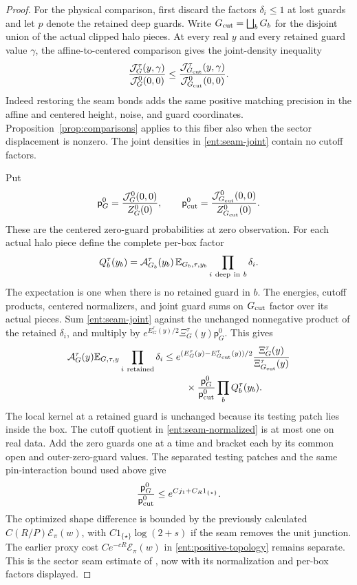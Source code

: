 \begin{proof}
For the physical comparison, first discard the factors
\(\delta_i\le1\) at lost guards and let \(p\) denote the retained
deep guards.  Write \(G_{\rm cut}=\bigsqcup_bG_b\) for the disjoint
union of the actual clipped halo pieces.  At every real \(y\) and
every retained guard value \(\gamma\), the affine-to-centered
comparison gives the joint-density inequality
\begin{equation}\label{ent:seam-joint}
 \frac{\mathcal J_G^\tau(y,\gamma)}{\mathcal J_G^0(0,0)}
 \le
 \frac{\mathcal J_{G_{\rm cut}}^\tau(y,\gamma)}
      {\mathcal J_{G_{\rm cut}}^0(0,0)}.
\end{equation}
Indeed restoring the seam bonds adds the same positive matching
precision in the affine and centered height, noise, and guard
coordinates.  Proposition~\ref{prop:comparisons} applies to this
fiber also when the sector displacement is nonzero.  The joint
densities in \eqref{ent:seam-joint} contain no cutoff factors.

Put
\[
 \mathsf p_G^0=\frac{\mathcal J_G^0(0,0)}{Z_G^0(0)},\qquad
 \mathsf p_{\rm cut}^0=
       \frac{\mathcal J_{G_{\rm cut}}^0(0,0)}{Z_{G_{\rm cut}}^0(0)}.
\]
These are the centered zero-guard probabilities at zero observation.
For each actual halo piece define the complete per-box factor
\begin{equation}\label{ent:box-factor}
 Q_b^\tau(y_b)=\mathcal A_{G_b}^\tau(y_b)\,
       \mathbb E_{G_b,\tau,y_b}\prod_{i\ {\rm deep\ in}\ b}\delta_i .
\end{equation}
The expectation is one when there is no retained guard in \(b\).
The energies, cutoff products, centered normalizers, and joint guard
sums on \(G_{\rm cut}\) factor over its actual pieces.  Sum
\eqref{ent:seam-joint} against the unchanged nonnegative product of
the retained \(\delta_i\), and multiply by
\(e^{E_G^\tau(y)/2}\Xi_G^\tau(y)\mathsf p_G^0\).  This gives
\begin{equation}\label{ent:seam-normalized}
\begin{split}
 \mathcal A_G^\tau(y)\mathbb E_{G,\tau,y}\prod_{i\ {\rm retained}}\delta_i
 \le {}&
 e^{(E_G^\tau(y)-E_{G_{\rm cut}}^\tau(y))/2}
 \frac{\Xi_G^\tau(y)}{\Xi_{G_{\rm cut}}^\tau(y)}\\
 &\quad{}\times
 \frac{\mathsf p_G^0}{\mathsf p_{\rm cut}^0}
 \prod_b Q_b^\tau(y_b).
\end{split}
\end{equation}
The local kernel at a retained guard is unchanged because its
testing patch lies inside the box.  The cutoff quotient in
\eqref{ent:seam-normalized} is at most one on real data.  Add the
zero guards one at a time and bracket each by its common open and
outer-zero-guard values.  The separated testing patches and the
same pin-interaction bound used above give
\[
       \frac{\mathsf p_G^0}{\mathsf p_{\rm cut}^0}
          \le e^{Cj_1+C_R1_{\{\star\}}}.
\]
The optimized shape difference is bounded by the previously
calculated \(C(R/P)\mathcal E_\pi(w)\), with
\(C1_{\{\star\}}\log(2+s)\) if the seam removes the unit junction.
The earlier proxy cost \(Ce^{-cR}\mathcal E_\pi(w)\) in
\eqref{ent:positive-topology} remains separate.  This is the
sector seam estimate of \cite[Equation~(9.21)]{B}, now with its
normalization and per-box factors displayed.


\end{proof}
